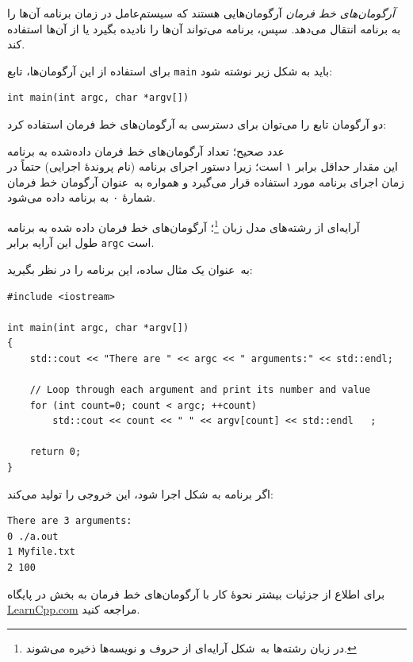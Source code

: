 \documentclass{utap}
\renewcommand{\labelitemi}{$\circ$}
\begin{document}
    \textit{آرگومان‌های خط فرمان} آرگومان‌هایی هستند که سیستم‌عامل در زمان برنامه آن‌ها را به برنامه انتقال می‌دهد. سپس، برنامه می‌تواند آن‌ها را نادیده بگیرد یا از آن‌ها استفاده کند.

    برای استفاده از این آرگومان‌ها، تابع \lstinline{main} باید به شکل زیر نوشته شود:
    \begin{latin}\begin{lstlisting}[aboveskip=-3ex]
int main(int argc, char *argv[])
    \end{lstlisting}\end{latin}

    دو آرگومان تابع
 را می‌توان برای دسترسی به آرگومان‌های خط فرمان استفاده کرد:
    \begin{description}[leftmargin=5em,style=nextline,font=\labelitemi\quad\bfseries]
        \item[\lr{\texttt{argc}}] عدد صحیح؛ تعداد آرگومان‌های خط فرمان داده‌شده به برنامه\\
        این مقدار حداقل برابر ۱ است؛ زیرا دستور اجرای برنامه (نام پروندهٔ اجرایی) حتماً در زمان اجرای برنامه مورد استفاده قرار می‌گیرد و همواره به~عنوان آرگومان خط فرمان شمارهٔ ۰ به برنامه داده می‌شود.
        \item[\lr{\texttt{argv}}] آرایه‌ای از رشته‌های مدل زبان \footnote{در زبان  رشته‌ها به~شکل آرایه‌ای از حروف و نویسه‌ها ذخیره می‌شوند.}؛ آرگومان‌های خط فرمان داده شده به برنامه\\
        طول این آرایه برابر \lstinline{argc} است.
    \end{description}

    به~عنوان یک مثال ساده، این برنامه را در نظر بگیرید:
    \begin{latin}\begin{lstlisting}
#include <iostream>
 
int main(int argc, char *argv[])
{
    std::cout << "There are " << argc << " arguments:" << std::endl;
 
    // Loop through each argument and print its number and value
    for (int count=0; count < argc; ++count)
        std::cout << count << " " << argv[count] << std::endl   ;
 
    return 0;
}

    \end{lstlisting}\end{latin}

    اگر برنامه به شکل  اجرا شود، این خروجی را تولید می‌کند:
    \begin{latin}%
    \begin{Verbatim}[fontsize=\small]
There are 3 arguments:
0 ./a.out
1 Myfile.txt
2 100
    \end{Verbatim}
    \end{latin}

    برای اطلاع از جزئیات بیشتر نحوهٔ کار با آرگومان‌های خط فرمان به بخش \href{https://www.learncpp.com/cpp-tutorial/713-command-line-arguments/}{} در پایگاه \url{LearnCpp.com} مراجعه کنید.
\end{document}
